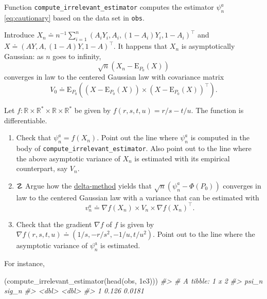 \documentclass[
  11pt,
  openright,twoside]{book}
\newenvironment{Shaded}{\begin{snugshade}}{\end{snugshade}}
\newcommand{\CommentTok}[1]{\textcolor[rgb]{0.56,0.35,0.01}{\textit{#1}}}
\newcommand{\FloatTok}[1]{\textcolor[rgb]{0.00,0.00,0.81}{#1}}
\newcommand{\FunctionTok}[1]{\textcolor[rgb]{0.00,0.00,0.00}{#1}}
\newcommand{\NormalTok}[1]{#1}
\DeclareRobustCommand{\stixdanger}{%
  {\usefont{U}{stixbbit}{m}{it}\symbol{"F6}}%
}
\newcommand{\bbR}{\mathbb{R}}
\newcommand{\defq}{\doteq}
\newcommand{\Exp}{\textrm{E}}
\theoremstyle{definition}
\theoremstyle{definition}
\theoremstyle{definition}
\theoremstyle{definition}
\theoremstyle{remark}
\begin{document}
Function \texttt{compute\_irrelevant\_estimator} computes the estimator \(\psi_{n}^{a}\)
\eqref{eq:cautionary} based on the data set in \texttt{obs}.

Introduce \(X_{n} \defq n^{-1}\sum_{i=1}^{n} \left(A_{i}Y_{i}, A_{i}, (1-A_{i})Y_{i}, 1-A_{i}\right)^{\top}\) and \(X \defq \left(AY, A, (1-A)Y, 1-A\right)^{\top}\). It happens that \(X_{n}\) is asymptotically Gaussian: as
\(n\) goes to infinity,\begin{equation*}\sqrt{n} \left(X_{n}  -  \Exp_{P_{0}}
(X)\right)\end{equation*} converges in law to the centered Gaussian law with
covariance matrix \begin{equation*}V_{0} \defq \Exp_{P_{0}} \left((X
- \Exp_{P_{0}} (X)) \times (X- \Exp_{P_{0}} (X))^{\top}\right).\end{equation*}

Let \(f:\bbR\times \bbR^{*} \times \bbR\times \bbR^{*}\) be given by \(f(r,s,t,u) = r/s - t/u\). The function is differentiable.

\begin{enumerate}
\def\labelenumi{\arabic{enumi}.}
\item
  Check that \(\psi_{n}^{a} = f(X_{n})\). Point out the line where
  \(\psi_{n}^{a}\) is computed in the body of \texttt{compute\_irrelevant\_estimator}.
  Also point out to the line where the above asymptotic variance of \(X_{n}\)
  is estimated with its empirical counterpart, say \(V_{n}\).
\item
  ☡ \stixdanger{} Argue how the \protect\hyperlink{prop-delta-method}{delta-method}
  yields that \(\sqrt{n}(\psi_{n}^{a} - \Phi(P_{0}))\) converges in law to the
  centered Gaussian law with a variance that can be estimated with
  \begin{equation}  v_{n}^{a}  \defq  \nabla f(X_{n})  \times  V_{n}  \times
  \nabla f(X_{n})^{\top}. \label{eq:v-n-a} \end{equation}
\item
  Check that the gradient \(\nabla f\) of \(f\) is given by \(\nabla f(r,s,t,u) \defq (1/s, -r/s^{2}, -1/u, t/u^{2})\). Point out to the line where the
  asymptotic variance of \(\psi_{n}^{a}\) is estimated.
\end{enumerate}

For instance,

\begin{Shaded}
\begin{Highlighting}[]
\NormalTok{(}\FunctionTok{compute\_irrelevant\_estimator}\NormalTok{(}\FunctionTok{head}\NormalTok{(obs, }\FloatTok{1e3}\NormalTok{)))}
\CommentTok{\#\textgreater{} \# A tibble: 1 x 2}
\CommentTok{\#\textgreater{}   psi\_n  sig\_n}
\CommentTok{\#\textgreater{}   \textless{}dbl\textgreater{}  \textless{}dbl\textgreater{}}
\CommentTok{\#\textgreater{} 1 0.126 0.0181}
\end{Highlighting}
\end{Shaded}
\end{document}

